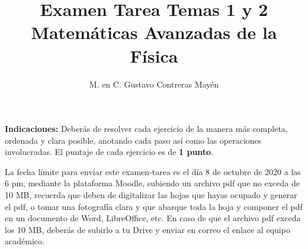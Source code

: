 
\geometry{top=1.25cm, bottom=1.5cm, left=1.25cm, right=0.8cm}
\title{Examen Tarea Temas 1 y 2 \\ \large {Matemáticas Avanzadas de la Física}  \vspace{-3ex}}
\author{M. en C. Gustavo Contreras Mayén}
\date{ }

\vspace{-4cm}
\maketitle
\fontsize{14}{14}\selectfont
\textbf{Indicaciones: } Deberás de resolver cada ejercicio de la manera más completa, ordenada y clara posible, anotando cada paso así como las operaciones involucradas. El puntaje de cada ejercicio es de \textbf{1 punto}.
\par
La fecha límite para enviar este examen-tarea es el día 8 de octubre de 2020 a las 6 pm, mediante la plataforma Moodle, subiendo un archivo pdf que no exceda de 10 MB, recuerda que deben de digitalizar las hojas que hayas ocupado y generar el pdf, o tomar una fotografía clara y que abarque toda la hoja y componer el pdf en un documento de Word, LibreOffice, etc. En caso de que el archivo pdf exceda los 10 MB, deberás de subirlo a tu Drive y enviar en correo el enlace al equipo académico.

